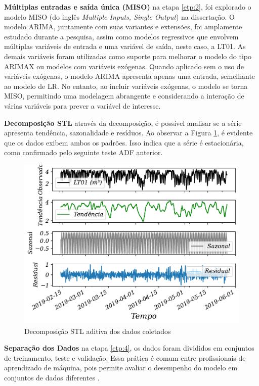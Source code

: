 \textbf{M\'ultiplas entradas e sa\'ida \'unica (MISO)}
na etapa \ref{etp:2}, foi explorado o modelo MISO (do inglês \textit{Multiple Inputs, Single Output}) na dissertação. O modelo ARIMA, juntamente com suas variantes e extensões, foi amplamente estudado durante a pesquisa, assim como modelos regressivos que envolvem múltiplas variáveis de entrada e uma variável de saída, neste caso, a LT01. As demais variáveis foram utilizadas como suporte para melhorar o modelo do tipo ARIMAX ou modelos com variáveis exógenas. Quando aplicado sem o uso de variáveis exógenas, o modelo ARIMA apresenta apenas uma entrada, semelhante ao modelo de LR. No entanto, ao incluir variáveis exógenas, o modelo se torna MISO, permitindo uma modelagem  abrangente e considerando a interação de várias variáveis para prever a variável de interesse.


\textbf{Decomposi\c c\~ao STL}
através da decomposição, é possível analisar se a série apresenta tendência, sazonalidade e resíduos. Ao observar a Figura \ref{fig:stl}, é evidente que os dados exibem ambos os padrões. Isso indica que a série é estacionária, como confirmado pelo seguinte teste ADF anterior.



\begin{figure}[!htb]
	\centering
	\caption{Decomposição STL aditiva dos dados coletados}
	\label{fig:stl}
	\includegraphics[width=0.8\linewidth]{Resultados/Figuras/STL}
	
	
	
\end{figure}






\textbf{Separa\c c\~ao dos Dados}
na etapa \ref{etp:4}, os dados foram divididos em conjuntos de treinamento, teste e validação. Essa prática é comum entre profissionais de aprendizado de máquina, pois permite avaliar o desempenho do modelo em conjuntos de dados diferentes \cite{raschka2015practical, geron2017hands_on}.

